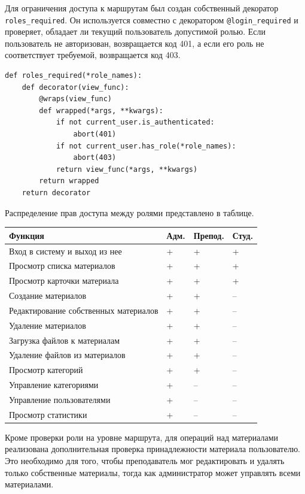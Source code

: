 \documentclass[14pt,a4paper]{extarticle}
\begin{document}
Для ограничения доступа к маршрутам был создан собственный декоратор \texttt{roles\_required}. Он используется совместно с декоратором \texttt{@login\_required} и проверяет, обладает ли текущий пользователь допустимой ролью. Если пользователь не авторизован, возвращается код 401, а если его роль не соответствует требуемой, возвращается код 403.

\begin{lstlisting}
def roles_required(*role_names):
    def decorator(view_func):
        @wraps(view_func)
        def wrapped(*args, **kwargs):
            if not current_user.is_authenticated:
                abort(401)
            if not current_user.has_role(*role_names):
                abort(403)
            return view_func(*args, **kwargs)
        return wrapped
    return decorator
\end{lstlisting}

Распределение прав доступа между ролями представлено в таблице.

\begin{center}
\begin{tabularx}{0.96\textwidth}{>{\raggedright\arraybackslash}X >{\centering\arraybackslash}p{2.3cm} >{\centering\arraybackslash}p{2.3cm} >{\centering\arraybackslash}p{2.3cm}}
\toprule
\textbf{Функция} & \textbf{Адм.} & \textbf{Препод.} & \textbf{Студ.} \\
\midrule
Вход в систему и выход из нее & + & + & + \\
Просмотр списка материалов & + & + & + \\
Просмотр карточки материала & + & + & + \\
Создание материалов & + & + & -- \\
Редактирование собственных материалов & + & + & -- \\
Удаление материалов & + & + & -- \\
Загрузка файлов к материалам & + & + & -- \\
Удаление файлов из материалов & + & + & -- \\
Просмотр категорий & + & + & -- \\
Управление категориями & + & -- & -- \\
Управление пользователями & + & -- & -- \\
Просмотр статистики & + & -- & -- \\
\bottomrule
\end{tabularx}
\end{center}

Кроме проверки роли на уровне маршрута, для операций над материалами реализована дополнительная проверка принадлежности материала пользователю. Это необходимо для того, чтобы преподаватель мог редактировать и удалять только собственные материалы, тогда как администратор может управлять всеми материалами.
\end{document}
